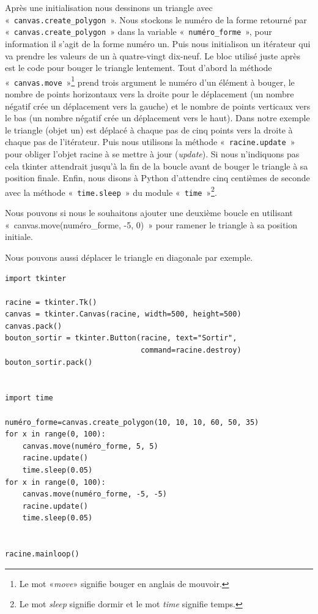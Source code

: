 Après une initialisation nous dessinons un triangle avec « \texttt{canvas.create\_polygon} ». 
Nous stockons le numéro de la forme retourné par « \texttt{canvas.create\_polygon} » dans la variable « \texttt{numéro\_forme} », pour information il s'agit de la forme numéro un.
Puis nous initialison un itérateur qui va prendre les valeurs de un à quatre-vingt dix-neuf. Le bloc utilisé juste après est le code pour bouger le triangle lentement. Tout d'abord la méthode « \texttt{canvas.move} »\footnote{Le mot «\emph{move}» signifie bouger en anglais de mouvoir.}  prend trois argument le numéro d'un élément à bouger, le nombre de points horizontaux vers la droite pour le déplacement (un nombre négatif crée un déplacement vers la gauche) et le nombre de points verticaux vers le bas (un nombre négatif crée un déplacement vers le haut). Dans notre exemple le triangle (objet un) est déplacé à chaque pas de cinq points vers la droite à chaque pas de l'itérateur.  
Puis nous utilisons la méthode « \texttt{racine.update} » pour obliger l'objet racine à se mettre à jour (\emph{update}). Si nous n'indiquons pas cela tkinter attendrait jusqu'à la fin de la boucle avant de bouger le triangle à sa position finale.  Enfin, nous disons à Python d'attendre cinq centièmes de seconde avec la méthode « \texttt{time.sleep} » du module « \texttt{time} »\footnote{Le mot \emph{sleep} signifie dormir et le mot \emph{time} signifie temps.}.

Nous pouvons si nous le souhaitons ajouter une deuxième boucle en utilisant  « canvas.move(numéro\_forme, -5, 0) »  pour ramener le triangle à sa position initiale.


Nous pouvons aussi déplacer le triangle en diagonale par exemple.

\begin{Verbatim}[frame=single,rulecolor=\color{mbleu}, label=à taper]
import tkinter

racine = tkinter.Tk()
canvas = tkinter.Canvas(racine, width=500, height=500)
canvas.pack()
bouton_sortir = tkinter.Button(racine, text="Sortir",
                               command=racine.destroy)
bouton_sortir.pack()


import time

numéro_forme=canvas.create_polygon(10, 10, 10, 60, 50, 35)
for x in range(0, 100):
    canvas.move(numéro_forme, 5, 5)
    racine.update()
    time.sleep(0.05)
for x in range(0, 100):
    canvas.move(numéro_forme, -5, -5)
    racine.update()
    time.sleep(0.05)


racine.mainloop()
\end{Verbatim}

